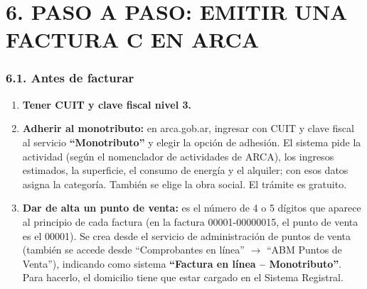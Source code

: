 \section*{6. PASO A PASO: EMITIR UNA FACTURA C EN ARCA}

\subsubsection*{6.1. Antes de facturar}
\begin{enumerate}
  \item \textbf{Tener CUIT y clave fiscal nivel 3.}
  \item \textbf{Adherir al monotributo:} en arca.gob.ar, ingresar con CUIT y clave fiscal al
        servicio \textbf{``Monotributo''} y elegir la opción de adhesión. El sistema pide
        la actividad (según el nomenclador de actividades de ARCA), los ingresos estimados,
        la superficie, el consumo de energía y el alquiler; con esos datos asigna la
        categoría. También se elige la obra social. El trámite es gratuito.
  \item \textbf{Dar de alta un punto de venta:} es el número de 4 o 5 dígitos que aparece
        al principio de cada factura (en la factura 00001-00000015, el punto de venta es el
        00001). Se crea desde el servicio de administración de puntos de venta (también se
        accede desde ``Comprobantes en línea'' $\rightarrow$ ``ABM Puntos de Venta''),
        indicando como sistema \textbf{``Factura en línea – Monotributo''}. Para hacerlo, el
        domicilio tiene que estar cargado en el Sistema Registral.
\end{enumerate}

